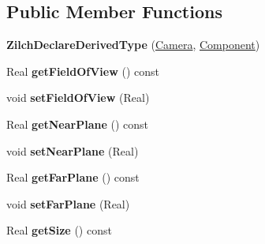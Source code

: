 \subsection*{Public Member Functions}
\begin{DoxyCompactItemize}
\item 
\hypertarget{classDCEngine_1_1Components_1_1Camera_ab1f8f7578addf35b6a55fd0ac8e4d9e1}{{\bfseries Zilch\-Declare\-Derived\-Type} (\hyperlink{classDCEngine_1_1Components_1_1Camera}{Camera}, \hyperlink{classDCEngine_1_1Component}{Component})}\label{classDCEngine_1_1Components_1_1Camera_ab1f8f7578addf35b6a55fd0ac8e4d9e1}

\item 
\hypertarget{classDCEngine_1_1Components_1_1Camera_ac7918d0075ae3b6a916ff44df0037128}{Real {\bfseries get\-Field\-Of\-View} () const }\label{classDCEngine_1_1Components_1_1Camera_ac7918d0075ae3b6a916ff44df0037128}

\item 
\hypertarget{classDCEngine_1_1Components_1_1Camera_a72c0a86f03f7da3ec74a1cfa5162ba8e}{void {\bfseries set\-Field\-Of\-View} (Real)}\label{classDCEngine_1_1Components_1_1Camera_a72c0a86f03f7da3ec74a1cfa5162ba8e}

\item 
\hypertarget{classDCEngine_1_1Components_1_1Camera_a7d048811a5bcf85c1b9b9a59ea20855c}{Real {\bfseries get\-Near\-Plane} () const }\label{classDCEngine_1_1Components_1_1Camera_a7d048811a5bcf85c1b9b9a59ea20855c}

\item 
\hypertarget{classDCEngine_1_1Components_1_1Camera_ac751387f7e27d0ec86752e2737242823}{void {\bfseries set\-Near\-Plane} (Real)}\label{classDCEngine_1_1Components_1_1Camera_ac751387f7e27d0ec86752e2737242823}

\item 
\hypertarget{classDCEngine_1_1Components_1_1Camera_a01f023f9d44a0a5a117a261384c481fc}{Real {\bfseries get\-Far\-Plane} () const }\label{classDCEngine_1_1Components_1_1Camera_a01f023f9d44a0a5a117a261384c481fc}

\item 
\hypertarget{classDCEngine_1_1Components_1_1Camera_a813522c95cfbd66911da43d94bbd0a5f}{void {\bfseries set\-Far\-Plane} (Real)}\label{classDCEngine_1_1Components_1_1Camera_a813522c95cfbd66911da43d94bbd0a5f}

\item 
\hypertarget{classDCEngine_1_1Components_1_1Camera_a53dee4bd5006d11eb5ea888875cd1cb3}{Real {\bfseries get\-Size} () const }\label{classDCEngine_1_1Components_1_1Camera_a53dee4bd5006d11eb5ea888875cd1cb3}


\end{DoxyCompactItemize}
